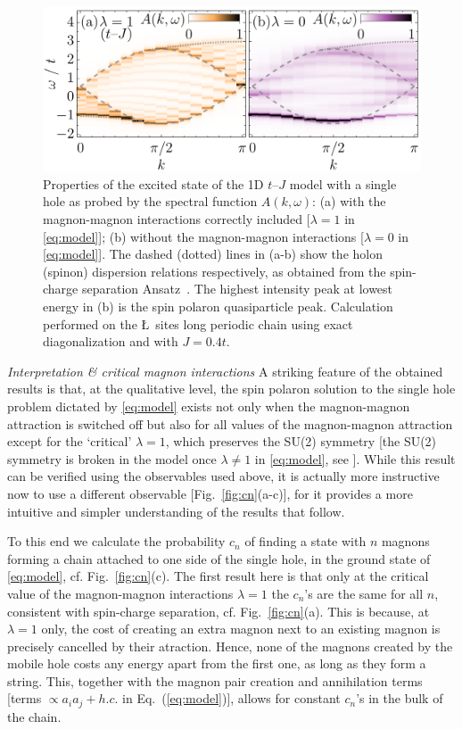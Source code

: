 \documentclass[%
 reprint,
 amsmath,amssymb,
 aps,
prl,
]{revtex4-1}
\begin{document}
\begin{figure}[t!]
    \includegraphics[width=\columnwidth]
    {fig_3.png}
\caption{
Properties of the excited state of the 1D $t$--$J$ model with a single hole
as probed by the spectral function $A(k,\omega)$: (a) with the magnon-magnon interactions correctly included
[$\lambda=1$ in \eqref{eq:model}];
(b) without the magnon-magnon interactions
[$\lambda=0$ in \eqref{eq:model}].
The dashed (dotted) lines in (a-b) show the holon (spinon) dispersion relations respectively, as obtained from the spin-charge separation Ansatz~\cite{Ede97, Kim97}. 
The highest intensity peak at lowest energy in (b) is the spin polaron quasiparticle peak.
Calculation performed on the \L~sites long periodic chain using exact diagonalization
and with $J=0.4t$.
}
\label{fig:spectra}
\end{figure}

{\it Interpretation \& critical magnon interactions}
A striking feature of the obtained results is that, at the qualitative level, the spin polaron solution to the single hole problem dictated by \eqref{eq:model} exists not only when the magnon-magnon attraction is switched off but also for all values of the magnon-magnon attraction except for the `critical' $\lambda = 1$,
which preserves the SU(2) symmetry
[the SU(2) symmetry is broken in the model once $\lambda \neq 1$ in \eqref{eq:model}, see \cite{SM}].
While this result can be verified using the observables used above, it is actually more instructive now to use a different observable [Fig.~\ref{fig:cn}(a-c)], for
it provides a more intuitive and simpler understanding of the results that follow. 


To this end we calculate the probability $c_n$ of finding a state with $n$ magnons forming a chain attached to one side of the single hole, in the ground state of \eqref{eq:model}, cf. Fig.~\ref{fig:cn}(c). The first result here is that only at the critical value of the magnon-magnon interactions $\lambda =1$ the $c_n$'s are the same for all $n$, 
consistent with spin-charge separation, cf. Fig.~\ref{fig:cn}(a). This is because, at $\lambda=1$ only, the cost of creating an extra magnon next to an existing magnon is precisely cancelled by their atraction. Hence, none of the magnons created by the mobile hole costs any energy apart from the first one, as long as they form a string. This, together with the magnon pair creation and annihilation terms [terms $\propto a_i a_j + h.c. $ in Eq.~(\ref{eq:model})], allows for constant $c_n$'s in the bulk of the chain.
\end{document}
